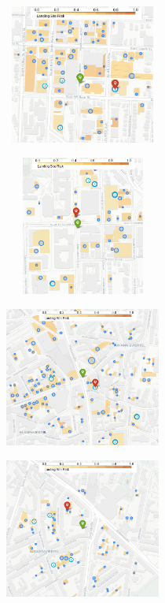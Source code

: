 \begin{figure}[!ht]
    \centering
      \begin{subfigure}[b]{0.47\linewidth}
        \centering\includegraphics[clip, width=155pt, height=130pt]{chapter_5_mapping/imgs/annarbor_scenario_2.png}
        \caption{\label{fig:ch5_aa_map1}}
      \end{subfigure}
      \begin{subfigure}[b]{0.47\linewidth}
        \centering\includegraphics[width=155pt, height=130pt]{chapter_5_mapping/imgs/annarbor_scenario_4.png}
        \caption{\label{fig:ch5_aa_map2}}
      \end{subfigure}
      \begin{subfigure}[b]{0.47\linewidth}
        \centering\includegraphics[clip, width=155pt, height=130pt]{chapter_5_mapping/imgs/witten_scenario_1.png}
        \caption{\label{fig:ch5_wt_map1}}
      \end{subfigure}
      \begin{subfigure}[b]{0.47\linewidth}
        \centering\includegraphics[width=155pt, height=130pt]{chapter_5_mapping/imgs/witten_scenario_2.png}

\end{subfigure}
\end{figure}
